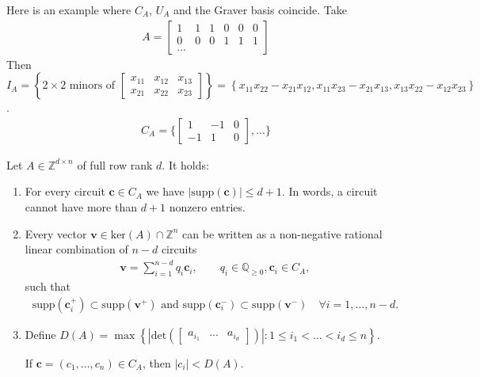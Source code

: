 \documentclass[a4paper, 11pt]{article}
\begin{document}
\begin{eg}
Here is an example where \( C_A \), \( U_A \) and the Graver basis coincide. Take 
\begin{align*}
  A = \begin{bmatrix}
    1 & 1 & 1 & 0 & 0 & 0 \\
    0 & 0 & 0 & 1& 1& 1 \\
    ...
  \end{bmatrix}
\end{align*}
Then \( I_A = \left\{ 2 \times 2 \text{ minors of } \begin{bmatrix} x_{11} & x_{12} & x_{13} \\ x_{21} & x_{22} & x_{23} \end{bmatrix} \right\} = \left\{ x_{11}x_{22} - x_{21}x_{12}, x_{11}x_{23} - x_{21}x_{13}, x_{13}x_{22} - x_{12}x_{23} \right\} \).
\begin{align*}
  C_A = \{\begin{bmatrix}
    1 & -1 & 0 \\
    -1 & 1 & 0
  \end{bmatrix}, ... \}
\end{align*}
\end{eg}


\begin{lemma}\label{lemmagraver}
  Let \( A \in \mathbb Z^{d \times n} \) of full row rank \( d \). It holds:
  \begin{enumerate}
    \item For every circuit \( \mathbf c \in C_A \) we have \( |\mathrm{supp}(\mathbf c)| \leq d +1 \). In words, a circuit cannot have more than \( d + 1 \) nonzero entries.
    \item Every vector \( \mathbf v \in \mathrm{ker}(A) \cap \mathbb Z^n \) can be written as a non-negative rational linear combination of \( n - d \) circuits
    \begin{align*}
      \mathbf v = \sum_{i=1}^{n-d} q_i \mathbf c_i, \qquad q_i \in \mathbb Q_{\geq 0}, \mathbf c_i \in C_A,
    \end{align*}
    such that 
    \begin{align*}
      \mathrm{supp}(\mathbf c_i^+) \subset \mathrm{supp}(\mathbf v^+) \text{ and } \mathrm{supp}(\mathbf c_i^-) \subset \mathrm{supp}(\mathbf v^-) \quad \forall i=1, \dots, n-d .
    \end{align*}

    \item Define \( D(A) = \max\left\{ 
      | \mathrm{det}(
        \begin{bmatrix}
          a_{i_1} & ... & a_{i_d}
        \end{bmatrix}
      ) | : 1 \leq i_1 < \dots < i_d \leq n
     \right\} \). 
     
     If \( \mathbf{c} = (c_1, \dots , c_n) \in C_A \), then \( |c_i| < D(A) \).
  \end{enumerate}
\end{lemma}
\end{document}
